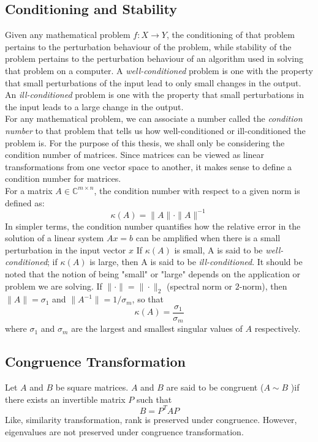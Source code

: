 \subsection{Conditioning and Stability}\label{section1.2.6}
Given any mathematical problem $f: X \rightarrow Y$, the conditioning of that problem pertains to the perturbation behaviour of the problem, while stability of the problem pertains to the perturbation behaviour of an algorithm used in solving that problem on a computer. A \textit{well-conditioned} problem is one with the property that small perturbations of the input lead to only small changes in the output. An \textit{ill-conditioned} problem is one with the property that small perturbations in the input leads to a large change in the output.\\
For any mathematical problem, we can associate a number called the \textit{condition number} to that problem that tells us how well-conditioned or ill-conditioned the problem is. For the purpose of this thesis, we shall only be considering the condition number of matrices. Since matrices can be viewed as linear transformations from one vector space to another, it makes sense to define a condition number for matrices.\\
For a matrix $A \in \mathbb{C}^{m\times n}$, the condition number with respect to a given norm is defined as:
\begin{equation}
	\kappa(A) = \|A\| \cdot \|A\|^{-1}
\end{equation}
In simpler terms, the condition number quantifies how the relative error in the solution of a linear system $Ax = b$ can be amplified when there is a small perturbation in the input vector $x$ If $\kappa(A)$ is small, A is said to be \textit{well-conditioned}; if $\kappa(A)$ is large, then A is said to be \textit{ill-conditioned}. It should be noted that the notion of being "small" or "large" depends on the application or problem we are solving. If $\| \cdot\| = \| \cdot \|_2$ (spectral norm or $2$-norm), then $\|A\| = \sigma_1$ and $\| A^{-1} \| = 1/\sigma_m$, so that
\begin{equation}
	\kappa(A) = \frac{\sigma_1}{\sigma_m}
\end{equation}
where $\sigma_1$ and $\sigma_m$ are the largest and smallest singular values of $A$ respectively.
\subsection{Congruence Transformation}
Let $A$ and $B$ be square matrices. $A$ and $B$ are said to be congruent ($A \sim B$ )if there exists an invertible matrix $P$ such that
\begin{equation}
	B = P^TAP
\end{equation}
Like, similarity transformation, rank is preserved under congruence. However, eigenvalues are not preserved under congruence transformation. 
